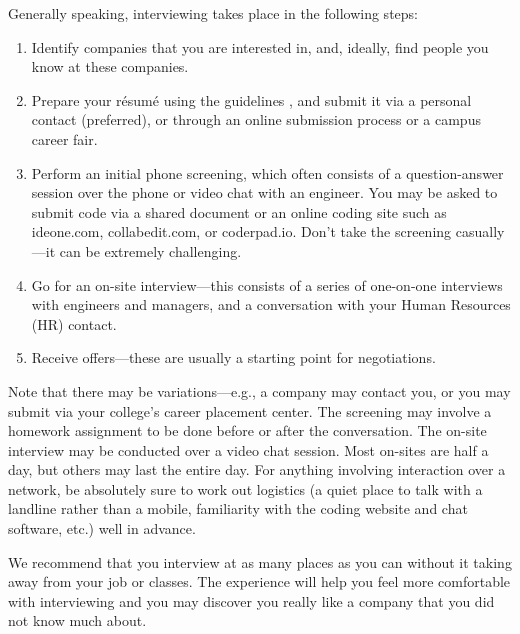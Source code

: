 \documentclass[10pt,openany,twoside,letterpaper,extrafontsizes]{memoir}
\newcommand{\myindex}[1]{%
\index[terms]{#1}%
}
\begin{document}
\begin{Spacing}{\gettingReadySpacing}
\noindent
Generally speaking, interviewing takes place in the following steps:
\begin{enumerate}[label=(\arabic*.), ref=(\arabic*.)]
\item Identify companies that you are interested in, and, ideally, find people you
know at these companies.
\item Prepare your r\'{e}sum\'{e} using the guidelines ,
and submit it via a personal contact (preferred),
or through an online submission process or a campus career fair.
\item Perform an initial phone screening, which often consists of a
question-answer session over the phone or video chat with an engineer. You may be asked
to submit code via a shared document
or an online coding site such as \textsf{ideone.com}, \textsf{collabedit.com}, or \textsf{coderpad.io}.
Don't take the screening casually---it can be extremely challenging.
\item Go for an on-site interview---this consists of a series of
one-on-one interviews with engineers and managers, and a conversation with your Human Resources (HR) contact.
\item Receive offers---these are usually a starting point for negotiations.
\end{enumerate}

Note that there may be variations---e.g., a company may contact you, or you may submit via
your college's career placement center.
The screening may involve a homework assignment to be done before or after the conversation.
The on-site interview may be conducted over a
video chat session. Most on-sites are half a day, but others may last the entire day.
For anything involving interaction over a \myindex{network}network, be absolutely
sure to work out logistics (a quiet place to talk with a landline rather than
a mobile, familiarity with the coding website and chat software, etc.) well in advance.

We recommend that you interview at as many places as you can without it taking
away from your job or classes. The experience will help you feel more comfortable
with interviewing
and you may discover you really like a company that you did not know much about.

\label{resume-writing}


\end{Spacing}
\end{document}
